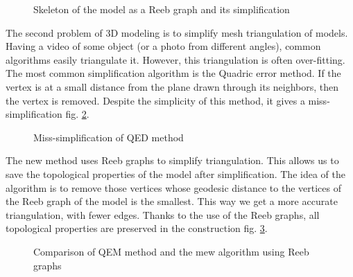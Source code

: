 \documentclass[]{article}
\begin{document}
\begin{figure}[h!]
\caption{Skeleton of the model as a Reeb graph and its simplification}
\label{fig:skeleton}
\end{figure}

The second problem of 3D modeling is to simplify mesh triangulation of models. Having a video of some object (or a photo from different angles), common algorithms easily triangulate it. However, this triangulation is often over-fitting. The most common simplification algorithm is the Quadric error method. If the vertex is at a small distance from the plane drawn through its neighbors, then the vertex is removed. Despite the simplicity of this method, it gives a miss-simplification fig. \ref{fig:QED}.\\
\begin{figure}[h!]
\caption{Miss-simplification of QED method}
\label{fig:QED}
\end{figure}

The new method uses Reeb graphs to simplify triangulation. This allows us to save the topological properties of the model after simplification. The idea of the algorithm is to remove those vertices whose geodesic distance to the vertices of the Reeb graph of the model is the smallest. This way we get a more accurate triangulation, with fewer edges. Thanks to the use of the Reeb graphs, all topological properties are preserved in the construction fig. \ref{fig:New_alg}.
\begin{figure}[h!]
\caption{Comparison of QEM method and the mew algorithm using Reeb graphs}
\label{fig:New_alg}
\end{figure}
\end{document}
